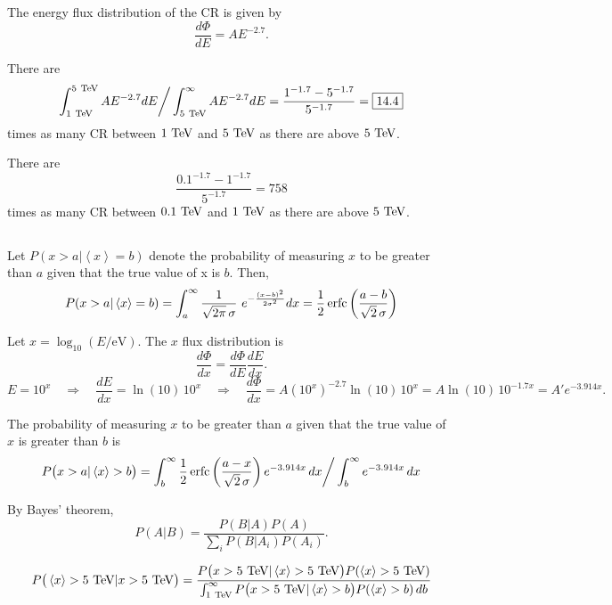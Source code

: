\subsection{}
The energy flux distribution of the CR is given by
\begin{equation}
  \frac{d\Phi}{dE} = A E^{-2.7}.
\end{equation}

There are
\begin{equation}
  \int_{1~\text{TeV}}^{5~\text{TeV}} A E^{-2.7} dE \bigg/ \int_{5~\text{TeV}}^{\infty} A E^{-2.7} dE
  = \frac{1^{-1.7}-5^{-1.7}}{5^{-1.7}}
  = \boxed{ 14.4 }
\end{equation}
times as many CR between $1~\text{TeV}$ and $5~\text{TeV}$ as there are above $5~\text{TeV}$.

There are
\begin{equation}
  \frac{0.1^{-1.7}-1^{-1.7}}{5^{-1.7}}
  = \boxed{ 758 }
\end{equation}
times as many CR between $0.1~\text{TeV}$ and $1~\text{TeV}$ as there are above $5~\text{TeV}$.

\subsection{}
Let $P(x>a|\left<x\right>=b)$ denote the probability of measuring $x$ to be greater than $a$ given that the true value of x is $b$. Then,
\begin{equation}
  P(x>a|\left<x\right>=b)
  = \int_a^\infty \frac{1}{\sqrt{2\pi}\,\sigma}\ e^{-\frac{(x-b)^2}{2\sigma^2}} dx
  = \frac{1}{2} \erfc\left(\frac{a-b}{\sqrt{2}\, \sigma}\right)
\end{equation}

Let $x = \log_{10}(E/\mathrm{eV})$.
The $x$ flux distribution is
\begin{equation}
  \frac{d\Phi}{dx} = \frac{d\Phi}{dE} \frac{dE}{dx}.
\end{equation}
\begin{equation}
  E = 10^x
  \quad \Rightarrow \quad
  \frac{dE}{dx} = \ln(10)\, 10^x
  \quad \Rightarrow \quad
  \frac{d\Phi}{dx} = A \left(10^x\right)^{-2.7} \ln(10)\, 10^x
  = A \ln(10)\, 10^{-1.7x} = A' e^{-3.914 x}.
\end{equation}

The probability of measuring $x$ to be greater than $a$ given that the true value of $x$ is greater than $b$ is
\begin{equation}
  P\big(x>a|\left<x\right>>b\big)
  = \int_b^\infty \frac{1}{2}\operatorname{erfc}\left(\frac{a-x}{\sqrt{2}\,\sigma}\right) e^{-3.914 x}\, dx
  \bigg/ \int_b^\infty e^{-3.914 x}\, dx
\end{equation}

By Bayes' theorem,
\begin{equation}
  P(A|B) = \frac{P(B|A) P(A)}{\sum_i P(B|A_i) P(A_i)}.
\end{equation}

\begin{equation}
  P\big(\left<x\right>>5~\text{TeV}|x>5~\text{TeV}\big)
  = \frac{
    P\big(x>5~\text{TeV}|\left<x\right>>5~\text{TeV}\big) P(\left<x\right>>5~\text{TeV})
  }{
    \int_{1~\text{TeV}}^\infty P\big(x>5~\text{TeV}|\left<x\right>>b\big) P(\left<x\right>>b)\, db
  }
\end{equation}



